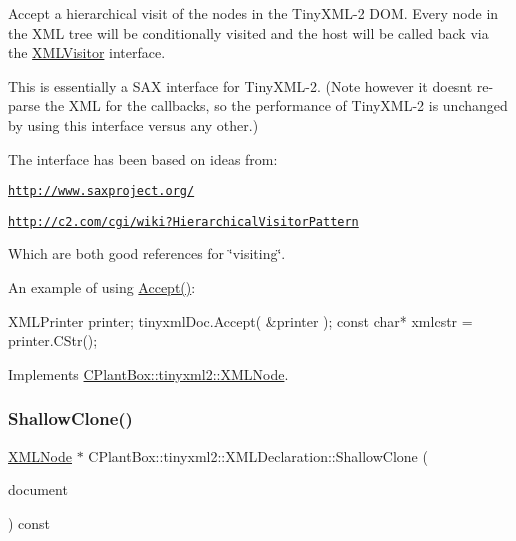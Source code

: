 Accept a hierarchical visit of the nodes in the Tiny\+X\+M\+L-\/2 D\+OM. Every node in the X\+ML tree will be conditionally visited and the host will be called back via the \hyperlink{classCPlantBox_1_1tinyxml2_1_1XMLVisitor}{X\+M\+L\+Visitor} interface.

This is essentially a S\+AX interface for Tiny\+X\+M\+L-\/2. (Note however it doesn\textquotesingle{}t re-\/parse the X\+ML for the callbacks, so the performance of Tiny\+X\+M\+L-\/2 is unchanged by using this interface versus any other.)

The interface has been based on ideas from\+:


\begin{DoxyItemize}
\item \href{http://www.saxproject.org/}{\tt http\+://www.\+saxproject.\+org/}
\item \href{http://c2.com/cgi/wiki?HierarchicalVisitorPattern}{\tt http\+://c2.\+com/cgi/wiki?\+Hierarchical\+Visitor\+Pattern}
\end{DoxyItemize}

Which are both good references for \char`\"{}visiting\char`\"{}.

An example of using \hyperlink{classCPlantBox_1_1tinyxml2_1_1XMLDeclaration_abc9e048a89ad5e21f3459c857465dd71}{Accept()}\+: \begin{DoxyVerb}XMLPrinter printer;
tinyxmlDoc.Accept( &printer );
const char* xmlcstr = printer.CStr();
\end{DoxyVerb}
 

Implements \hyperlink{classCPlantBox_1_1tinyxml2_1_1XMLNode_a2cdc6f044bd1f971e211328e42a4f9d5}{C\+Plant\+Box\+::tinyxml2\+::\+X\+M\+L\+Node}.

\mbox{\label{classCPlantBox_1_1tinyxml2_1_1XMLDeclaration_a955c5e437aa8423ee194a69a42549f60}} 
\subsubsection{\texorpdfstring{Shallow\+Clone()}{ShallowClone()}}
{\footnotesize\ttfamily \hyperlink{classCPlantBox_1_1tinyxml2_1_1XMLNode}{X\+M\+L\+Node} $\ast$ C\+Plant\+Box\+::tinyxml2\+::\+X\+M\+L\+Declaration\+::\+Shallow\+Clone (\begin{DoxyParamCaption}\item[{\hyperlink{classCPlantBox_1_1tinyxml2_1_1XMLDocument}{X\+M\+L\+Document} $\ast$}]{document }\end{DoxyParamCaption}) const\hspace{0.3cm}{\ttfamily [virtual]}}

